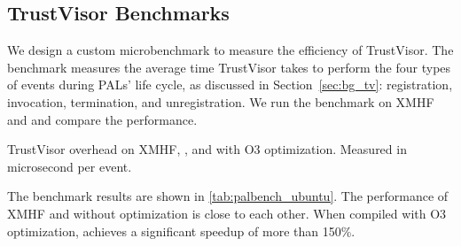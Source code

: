 \subsection{TrustVisor Benchmarks}
\label{sec:evaluation_perf_xmhf_tv}

We design a custom microbenchmark to measure the efficiency of TrustVisor. The benchmark measures the average time TrustVisor takes to perform the four types of events during PALs' life cycle, as discussed in Section~\ref{sec:bg_tv}: registration, invocation, termination, and unregistration. We run the benchmark on XMHF and  and compare the performance.

\begin{table}[tbp]
	\begin{center}
	
	\caption[TrustVisor overhead on XMHF, , and  with O3 optimization.]{TrustVisor overhead on XMHF, , and  with O3 optimization. Measured in microsecond per event.}
	\label{tab:palbench_ubuntu}
	\end{center}
\end{table}

The benchmark results are shown in \ref{tab:palbench_ubuntu}. The performance of XMHF and  without optimization is close to each other. When compiled with O3 optimization,  achieves a significant speedup of more than 150\%.

